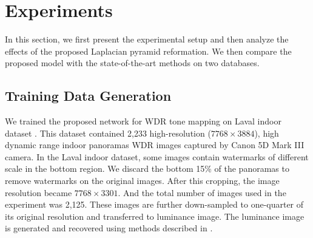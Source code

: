 \documentclass[journal]{IEEEtran}
\begin{document}
\section{Experiments}
In this section, we first present the experimental setup and then analyze the effects of the proposed Laplacian pyramid reformation. We then compare the proposed model with the state-of-the-art methods on two databases.

\subsection{Training Data Generation}
We trained the proposed network for WDR tone mapping on Laval indoor dataset \cite{gardner2017learning}. This dataset contained 2,233 high-resolution ($7768 \times 3884$), high dynamic range indoor panoramas WDR images captured by Canon 5D Mark III camera. 
In the Laval indoor dataset, some images contain watermarks of different scale in the bottom region. %
We discard the bottom 15\% of the panoramas to remove watermarks on the original images. %
After this cropping, the image resolution became $7768 \times 3301$.  And the total number of images used in the experiment was 2,125.
These images are further down-sampled to one-quarter of its original resolution and transferred to luminance image. The luminance image is generated and recovered using methods described in \cite{gu2013local}.
\end{document}
